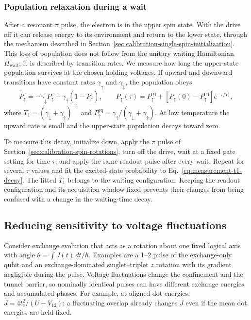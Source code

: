\subsubsection{Population relaxation during a wait}
\label{sec:measurement-relaxation}

After a resonant $\pi$ pulse, the electron is in the upper spin
state. With the drive off it can release energy to its environment
and return to the lower state, through the mechanism described in
Section~\ref{sec:calibration-single-spin-initialization}.
This loss of population does not follow from the unitary waiting
Hamiltonian $H_{\mathrm{wait}}$; it is described by transition
rates. We measure how long the upper-state population survives at
the chosen holding voltages. If upward and downward transitions have constant rates
$\gamma_\uparrow$ and $\gamma_\downarrow$, the population obeys
\begin{equation}
 \dot P_\uparrow=-\gamma_\downarrow P_\uparrow
                   +\gamma_\uparrow(1-P_\uparrow),\qquad
 P_\uparrow(\tau)=P_\uparrow^{\mathrm{eq}}
      +[P_\uparrow(0)-P_\uparrow^{\mathrm{eq}}]e^{-\tau/T_1},
 \label{eq:measurement-t1-decay}
\end{equation}
where $T_1=(\gamma_\downarrow+\gamma_\uparrow)^{-1}$ and
$P_\uparrow^{\mathrm{eq}}=\gamma_\uparrow/
(\gamma_\downarrow+\gamma_\uparrow)$. At low temperature the
upward rate is small and the upper-state population decays toward
zero.

To measure this decay, initialize down, apply the $\pi$ pulse of
Section~\ref{sec:calibration-spin-rotations}, turn off the drive,
wait at a fixed gate setting for time $\tau$, and apply the same
readout pulse after every wait. Repeat for several $\tau$ values
and fit the excited-state probability to
Eq.~\eqref{eq:measurement-t1-decay}. The fitted $T_1$ belongs to
the waiting configuration. Keeping the readout configuration and
its acquisition window fixed prevents their changes from being
confused with a change in the waiting-time decay.

\subsection{Reducing sensitivity to voltage fluctuations}

Consider exchange evolution that acts as a rotation about one
fixed logical axis with angle $\theta=\int J(t)\,dt/\hbar$.
Examples are a 1--2 pulse of the exchange-only qubit and an
exchange-dominated singlet--triplet $z$ rotation with its
gradient negligible during the pulse. Voltage fluctuations change
the confinement and the tunnel barrier, so nominally identical
pulses can have different exchange energies and accumulated phases.
For example, at aligned dot energies, $J=4t_c^2/(U-V_{12})$:
a fluctuating overlap already changes $J$ even if the mean dot
energies are held fixed.

